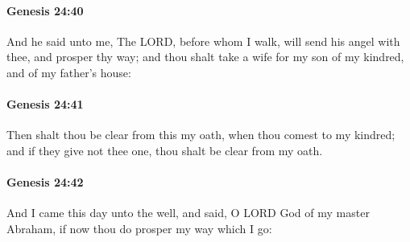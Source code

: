 		\paragraph{Genesis 24:40} %
			\label{GENESIS-24-40}

			And he said unto me, The LORD, before whom I walk, will send his angel with thee, and prosper thy way; and thou shalt take a wife for my son of my kindred, and of my father's house:


		\paragraph{Genesis 24:41} %
			\label{GENESIS-24-41}

			Then shalt thou be clear from this my oath, when thou comest to my kindred; and if they give not thee one, thou shalt be clear from my oath.


		\paragraph{Genesis 24:42} %
			\label{GENESIS-24-42}

			And I came this day unto the well, and said, O LORD God of my master Abraham, if now thou do prosper my way which I go:


